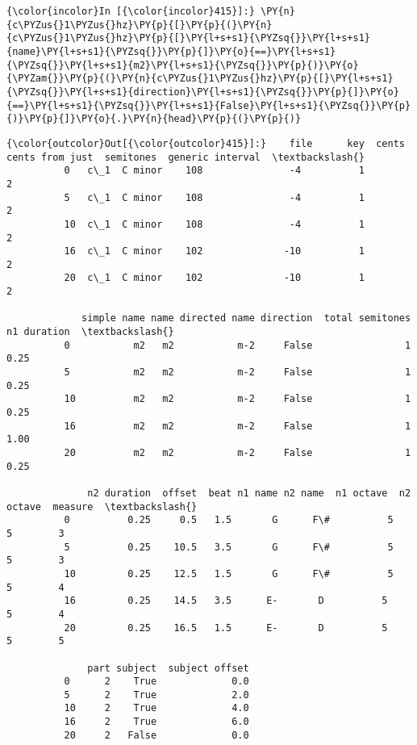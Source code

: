    \begin{Verbatim}[commandchars=\\\{\}]
{\color{incolor}In [{\color{incolor}415}]:} \PY{n}{c\PYZus{}1\PYZus{}hz}\PY{p}{[}\PY{p}{(}\PY{n}{c\PYZus{}1\PYZus{}hz}\PY{p}{[}\PY{l+s+s1}{\PYZsq{}}\PY{l+s+s1}{name}\PY{l+s+s1}{\PYZsq{}}\PY{p}{]}\PY{o}{==}\PY{l+s+s1}{\PYZsq{}}\PY{l+s+s1}{m2}\PY{l+s+s1}{\PYZsq{}}\PY{p}{)}\PY{o}{\PYZam{}}\PY{p}{(}\PY{n}{c\PYZus{}1\PYZus{}hz}\PY{p}{[}\PY{l+s+s1}{\PYZsq{}}\PY{l+s+s1}{direction}\PY{l+s+s1}{\PYZsq{}}\PY{p}{]}\PY{o}{==}\PY{l+s+s1}{\PYZsq{}}\PY{l+s+s1}{False}\PY{l+s+s1}{\PYZsq{}}\PY{p}{)}\PY{p}{]}\PY{o}{.}\PY{n}{head}\PY{p}{(}\PY{p}{)}
\end{Verbatim}
\begin{Verbatim}[commandchars=\\\{\}]
{\color{outcolor}Out[{\color{outcolor}415}]:}    file      key  cents  cents from just  semitones  generic interval  \textbackslash{}
          0   c\_1  C minor    108               -4          1                 2   
          5   c\_1  C minor    108               -4          1                 2   
          10  c\_1  C minor    108               -4          1                 2   
          16  c\_1  C minor    102              -10          1                 2   
          20  c\_1  C minor    102              -10          1                 2   
          
             simple name name directed name direction  total semitones  n1 duration  \textbackslash{}
          0           m2   m2           m-2     False                1         0.25   
          5           m2   m2           m-2     False                1         0.25   
          10          m2   m2           m-2     False                1         0.25   
          16          m2   m2           m-2     False                1         1.00   
          20          m2   m2           m-2     False                1         0.25   
          
              n2 duration  offset  beat n1 name n2 name  n1 octave  n2 octave  measure  \textbackslash{}
          0          0.25     0.5   1.5       G      F\#          5          5        3   
          5          0.25    10.5   3.5       G      F\#          5          5        3   
          10         0.25    12.5   1.5       G      F\#          5          5        4   
          16         0.25    14.5   3.5      E-       D          5          5        4   
          20         0.25    16.5   1.5      E-       D          5          5        5   
          
              part subject  subject offset  
          0      2    True             0.0  
          5      2    True             2.0  
          10     2    True             4.0  
          16     2    True             6.0  
          20     2   False             0.0  
\end{Verbatim}
